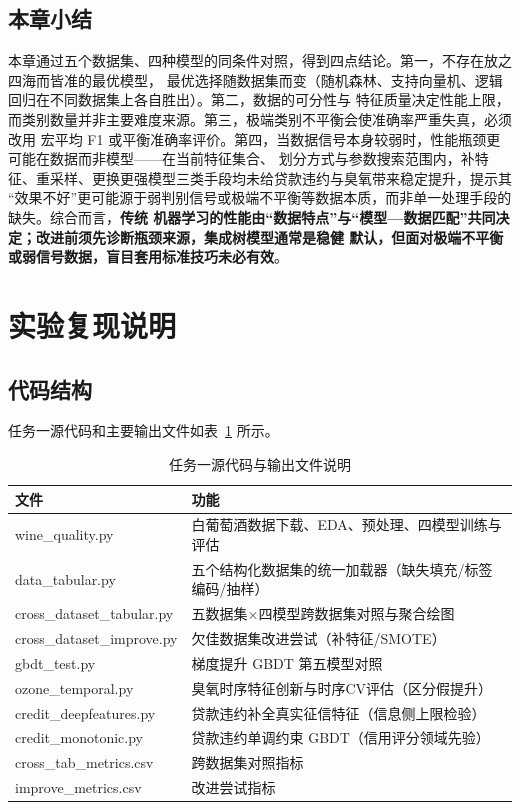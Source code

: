 \documentclass[12pt,a4paper,fontset=fandol]{ctexart}
\numberwithin{figure}{section}
\numberwithin{table}{section}
\numberwithin{equation}{section}
\begin{document}
\subsection{本章小结}
本章通过五个数据集、四种模型的同条件对照，得到四点结论。第一，不存在放之四海而皆准的最优模型，
最优选择随数据集而变（随机森林、支持向量机、逻辑回归在不同数据集上各自胜出）。第二，数据的可分性与
特征质量决定性能上限，而类别数量并非主要难度来源。第三，极端类别不平衡会使准确率严重失真，必须改用
宏平均 F1 或平衡准确率评价。第四，当数据信号本身较弱时，性能瓶颈更可能在数据而非模型——在当前特征集合、
划分方式与参数搜索范围内，补特征、重采样、更换更强模型三类手段均未给贷款违约与臭氧带来稳定提升，提示其
“效果不好”更可能源于弱判别信号或极端不平衡等数据本质，而非单一处理手段的缺失。综合而言，\textbf{传统
机器学习的性能由“数据特点”与“模型—数据匹配”共同决定；改进前须先诊断瓶颈来源，集成树模型通常是稳健
默认，但面对极端不平衡或弱信号数据，盲目套用标准技巧未必有效}。

\section{实验复现说明}

\subsection{代码结构}
任务一源代码和主要输出文件如表~\ref{tab:code} 所示。
\begin{table}[H]
  \centering
  \caption{任务一源代码与输出文件说明}
  \label{tab:code}
  \begin{tabular}{ll}
    \toprule
    文件 & 功能 \\
    \midrule
    wine\_quality.py & 白葡萄酒数据下载、EDA、预处理、四模型训练与评估 \\
    data\_tabular.py & 五个结构化数据集的统一加载器（缺失填充/标签编码/抽样） \\
    cross\_dataset\_tabular.py & 五数据集×四模型跨数据集对照与聚合绘图 \\
    cross\_dataset\_improve.py & 欠佳数据集改进尝试（补特征/SMOTE） \\
    gbdt\_test.py & 梯度提升 GBDT 第五模型对照 \\
    ozone\_temporal.py & 臭氧时序特征创新与时序CV评估（区分假提升） \\
    credit\_deepfeatures.py & 贷款违约补全真实征信特征（信息侧上限检验） \\
    credit\_monotonic.py & 贷款违约单调约束 GBDT（信用评分领域先验） \\
    cross\_tab\_metrics.csv & 跨数据集对照指标 \\
    improve\_metrics.csv & 改进尝试指标 \\
    \bottomrule
  \end{tabular}
\end{table}
\end{document}

